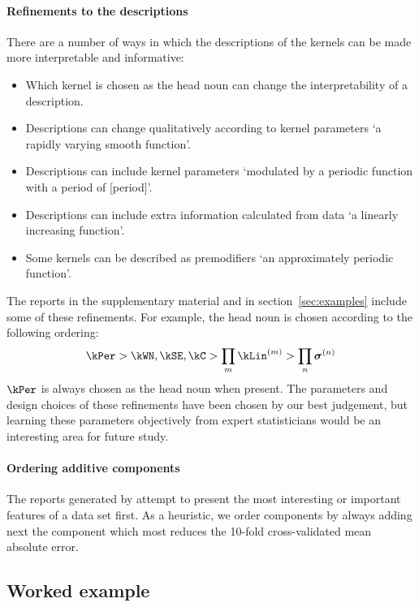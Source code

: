 \paragraph{Refinements to the descriptions}

There are a number of ways in which the descriptions of the kernels can be made more interpretable and informative:
\begin{itemize}
  \item Which kernel is chosen as the head noun can change the interpretability of a description.
  \item Descriptions can change qualitatively according to kernel parameters \eg `a rapidly varying smooth function'.
  \item Descriptions can include kernel parameters \eg `modulated by a periodic function with a period of [period]'.
  \item Descriptions can include extra information calculated from data \eg `a linearly increasing function'.
  \item Some kernels can be described as premodifiers \eg `an approximately periodic function'.
\end{itemize}

The reports in the supplementary material and in section~\ref{sec:examples} include some of these refinements.
For example, the head noun is chosen according to the following ordering:
\begin{align*}
\kPer > \kWN, \kSE, \kC > \prod_m \kLin^{(m)} > \prod_n \boldsymbol\sigma^{(n)}
\end{align*}
\ie $\kPer$ is always chosen as the head noun when present.
The parameters and design choices of these refinements have been chosen by our best judgement, but learning these parameters objectively from expert statisticians would be an interesting area for future study.

\paragraph{Ordering additive components}

The reports generated by \procedurename{} attempt to present the most interesting or important features of a data set first.
As a heuristic, we order components by always adding next the component which most reduces the 10-fold cross-validated mean absolute error.

\subsection{Worked example}


